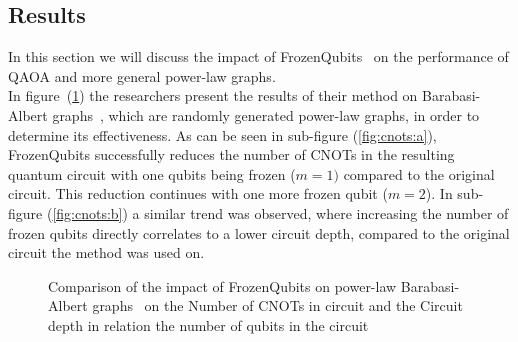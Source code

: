 \subsection{Results}\label{results}
In this section we will discuss the impact of FrozenQubits~\cite{frozenqubits} on the performance of QAOA and more general power-law graphs. \\
In figure~(\ref{fig:cnots}) the researchers present the results of their method on Barabasi-Albert graphs~\cite{barabasi}, which are randomly generated power-law graphs, in order to determine its effectiveness. As can be seen in sub-figure (\ref{fig:cnots:a}), FrozenQubits successfully reduces the number of CNOTs in the resulting quantum circuit with one qubits being frozen ($m=1)$ compared to the original circuit. This reduction continues with one more frozen qubit ($m=2$). In sub-figure (\ref{fig:cnots:b}) a similar trend was observed, where increasing the number of frozen qubits directly correlates to a lower circuit depth, compared to the original circuit the method was used on.
\begin{figure}[H]
    \centering 
    \hfill
    \caption{\label{fig:cnots}Comparison of the impact of FrozenQubits on power-law Barabasi-Albert graphs~\cite{barabasi} on the Number of CNOTs in circuit and the Circuit depth in relation the number of qubits in the circuit}
\end{figure}
